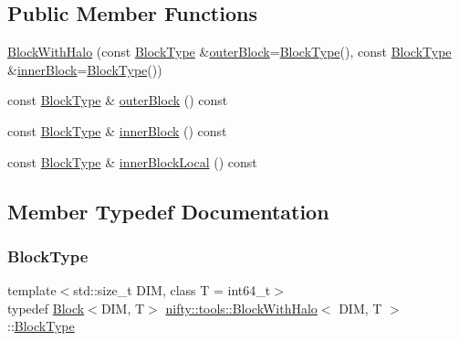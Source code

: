 \subsection*{Public Member Functions}
\begin{DoxyCompactItemize}
\item 
\hyperlink{classnifty_1_1tools_1_1BlockWithHalo_ad80f17f6eea4c3d40e61eda04134ffe6}{Block\+With\+Halo} (const \hyperlink{classnifty_1_1tools_1_1BlockWithHalo_a98d2c04518f8902ab6d985feba605987}{Block\+Type} \&\hyperlink{classnifty_1_1tools_1_1BlockWithHalo_ad9ef106320b3d96752fefadc75c7c909}{outer\+Block}=\hyperlink{classnifty_1_1tools_1_1BlockWithHalo_a98d2c04518f8902ab6d985feba605987}{Block\+Type}(), const \hyperlink{classnifty_1_1tools_1_1BlockWithHalo_a98d2c04518f8902ab6d985feba605987}{Block\+Type} \&\hyperlink{classnifty_1_1tools_1_1BlockWithHalo_af5e819b206d1c12dd3dfd57120306dd0}{inner\+Block}=\hyperlink{classnifty_1_1tools_1_1BlockWithHalo_a98d2c04518f8902ab6d985feba605987}{Block\+Type}())
\item 
const \hyperlink{classnifty_1_1tools_1_1BlockWithHalo_a98d2c04518f8902ab6d985feba605987}{Block\+Type} \& \hyperlink{classnifty_1_1tools_1_1BlockWithHalo_ad9ef106320b3d96752fefadc75c7c909}{outer\+Block} () const
\item 
const \hyperlink{classnifty_1_1tools_1_1BlockWithHalo_a98d2c04518f8902ab6d985feba605987}{Block\+Type} \& \hyperlink{classnifty_1_1tools_1_1BlockWithHalo_af5e819b206d1c12dd3dfd57120306dd0}{inner\+Block} () const
\item 
const \hyperlink{classnifty_1_1tools_1_1BlockWithHalo_a98d2c04518f8902ab6d985feba605987}{Block\+Type} \& \hyperlink{classnifty_1_1tools_1_1BlockWithHalo_a44a2f5e1384cbf09fd29810c4868de0b}{inner\+Block\+Local} () const
\end{DoxyCompactItemize}


\subsection{Member Typedef Documentation}
\mbox{\label{classnifty_1_1tools_1_1BlockWithHalo_a98d2c04518f8902ab6d985feba605987}} 
\subsubsection{\texorpdfstring{Block\+Type}{BlockType}}
{\footnotesize\ttfamily template$<$std\+::size\+\_\+t D\+IM, class T  = int64\+\_\+t$>$ \\
typedef \hyperlink{classnifty_1_1tools_1_1Block}{Block}$<$D\+IM, T$>$ \hyperlink{classnifty_1_1tools_1_1BlockWithHalo}{nifty\+::tools\+::\+Block\+With\+Halo}$<$ D\+IM, T $>$\+::\hyperlink{classnifty_1_1tools_1_1BlockWithHalo_a98d2c04518f8902ab6d985feba605987}{Block\+Type}}


